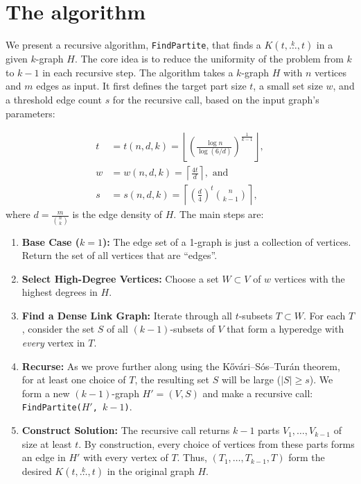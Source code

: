 \documentclass[11pt,a4paper]{article}
\newcommand{\compoverset}[2]{\ensuremath{K(#2, \overset{#1}{\dots}, #2)}}
\theoremstyle{definition}
\begin{document}
\section{The algorithm}\label{sec:finding-a-balanced-$k$-partite-subgraph}

We present a recursive algorithm, \texttt{FindPartite}, that finds a $\compoverset{k}{t}$ in a given $k$-graph $H$.
The core idea is to reduce the uniformity of the problem from $k$ to $k-1$ in each recursive step.
The algorithm takes a $k$-graph $H$ with $n$ vertices and $m$ edges as input.
It first defines the target part size $t$, a small set size $w$,
and a threshold edge count $s$ for the recursive call, based on the input graph's parameters:

\begin{align*}
    t &= t(n, d, k) = \left\lfloor \left( \frac{\log n}{\log (6/d)}  \right)^{\frac{1}{k-1}} \right \rfloor, \\
    w &= w(n, d, k) = \left\lceil \frac{4 t}{d} \right\rceil, \text{ and } \\
    s &= s(n, d, k) = \left\lceil \left( \frac{d}{4} \right)^t \binom{n}{k-1} \right\rceil,
\end{align*}
where $d = \frac{m}{\binom{n}{k}}$ is the edge density of $H$.
The main steps are:
\begin{enumerate}
    \item \textbf{Base Case ($k=1$):} The edge set of a 1-graph is just a collection of vertices.
    Return the set of all vertices that are ``edges''.

    \item \textbf{Select High-Degree Vertices:} Choose a set $W \subset V$ of $w$ vertices with the highest degrees in $H$.

    \item \textbf{Find a Dense Link Graph:} Iterate through all $t$-subsets $T \subset W$.
    For each $T$, consider the set $S$ of all $(k-1)$-subsets of $V$ that form a hyperedge with \emph{every} vertex in $T$. \label{link}

    \item \textbf{Recurse:} As we prove further along using the Kővári–Sós–Turán theorem, for at least one choice of $T$,
    the resulting set $S$ will be large ($|S| \ge s$). We form a new $(k-1)$-graph $H'=(V, S)$ and make a recursive call: \texttt{FindPartite($H'$, $k-1$)}.

    \item \textbf{Construct Solution:} The recursive call returns $k-1$ parts $V_1, \dots, V_{k-1}$ of size at least $t$.
    By construction, every choice of vertices from these parts forms an edge in $H'$ with every vertex of $T$.
    Thus, $(T_1, \dots, T_{k-1}, T)$ form the desired $\compoverset{k}{t}$ in the original graph $H$.

\end{enumerate}
\end{document}
